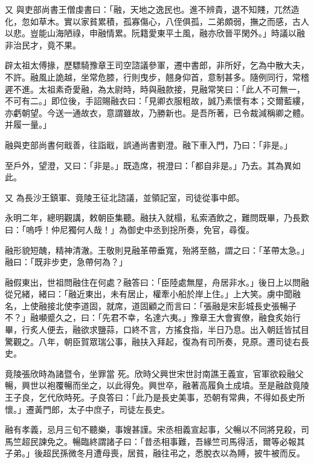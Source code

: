 \begin{pinyinscope}
 又
 與吏部尚書王僧虔書曰：「融，天地之逸民也。進不辨貴，退不知賤，兀然造化，忽如草木。實以家貧累積，孤寡傷心，八侄俱孤，二弟頗弱，撫之而感，古人以悲。豈能山海陋祿，申融情累。阮籍愛東平土風，融亦欣晉平閑外。」時議以融非治民才，竟不果。



 辟太祖太傅掾，歷驃騎豫章王司空諮議參軍，遷中書郎，非所好，乞為中散大夫，不許。融風止詭越，坐常危膝，行則曳步，翹身仰首，意制甚多。隨例同行，常稽遲不進。太祖素奇愛融，為太尉時，時與融款接，見融常笑曰：「此人不可無一，不可有二。」即位後，手詔賜融衣曰：「見卿衣服粗故，誠乃素懷有本；交爾藍縷，亦虧朝望。今送一通故衣，意謂雖故，乃勝新也。是吾所著，已令裁減稱卿之體。并履一量。」



 融與吏部尚書何戢善，往詣戢，誤通尚書劉澄。融下車入門，乃曰：「非是。」



 至戶外，望澄，又曰：「非是。」既造席，視澄曰：「都自非是。」乃去。其為異如此。



 又
 為長沙王鎮軍、竟陵王征北諮議，並領記室，司徒從事中郎。



 永明二年，總明觀講，敕朝臣集聽。融扶入就榻，私索酒飲之，難問既畢，乃長歎曰：「嗚呼！仲尼獨何人哉！」為御史中丞到捴所奏，免官，尋復。



 融形貌短醜，精神清澈。王敬則見融革帶垂寬，殆將至骼，謂之曰：「革帶太急。」融曰：「既非步吏，急帶何為？」



 融假東出，世祖問融住在何處？融答曰：「臣陸處無屋，舟居非水。」後日上以問融從兄緒，緒曰：「融近東出，未有居止，權牽小船於岸上住。」上大笑。虜中聞融名，上使融接北使李道固，就席，道固顧之而言曰：「張融是宋彭城長史張暢子不？」融嚬蹙久之，曰：「先君不幸，名達六夷。」豫章王大會賓僚，融食炙始行畢，行炙人便去，融欲求鹽蒜，口終不言，方搖食指，半日乃息。出入朝廷皆拭目驚觀之。八年，朝臣賀眾瑞公事，融扶入拜起，復為有司所奏，見原。遷司徒右長史。



 竟陵張欣時為諸暨令，坐罪當
 死。欣時父興世宋世討南譙王義宣，官軍欲殺融父暢，興世以袍覆暢而坐之，以此得免。興世卒，融著高履負土成墳。至是融啟竟陵王子良，乞代欣時死。子良答曰：「此乃是長史美事，恐朝有常典，不得如長史所懷。」遷黃門郎，太子中庶子，司徒左長史。



 融有孝義，忌月三旬不聽樂，事嫂甚謹。宋丞相義宣起事，父暢以不同將見殺，司馬竺超民諫免之。暢臨終謂諸子曰：「昔丞相事難，吾緣竺司馬得活，爾等必報其子弟。」後超民孫微冬月遭母喪，居貧，融往弔之，悉脫衣以為賻，披牛被而反。




\end{pinyinscope}
